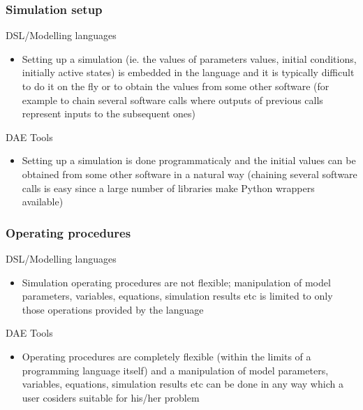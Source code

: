 \documentclass[compress,newPxFont,sthlmFooter]{beamer}
\begin{document}
\begin{frame}
\frametitle{Simulation setup}
\begin{block}{\textcolor{light_red}{DSL/Modelling languages}}
\begin{itemize}
  \item Setting up a simulation (ie. the values of parameters values, initial conditions, initially active states)
        is embedded in the language and it is typically difficult to do it on the fly or to obtain the values from some other software
        (for example to chain several software calls where outputs of previous calls represent inputs to the subsequent ones) 
\end{itemize}
\end{block}

\begin{block}{\textcolor{light_green}{DAE Tools}}
\begin{itemize}
  \item Setting up a simulation is done programmaticaly and the initial values can be obtained from some other software in a natural way
        (chaining several software calls is easy since a large number of libraries make Python wrappers available)
\end{itemize}
\end{block}
\end{frame}

\begin{frame}
\frametitle{Operating procedures}
\begin{block}{\textcolor{light_red}{DSL/Modelling languages}}
\begin{itemize}
  \item Simulation operating procedures are not flexible; manipulation of model parameters, variables, equations, simulation results
        etc is limited to only those operations provided by the language 
\end{itemize}
\end{block}

\begin{block}{\textcolor{light_green}{DAE Tools}}
\begin{itemize}
  \item Operating procedures are completely flexible (within the limits of a programming language itself)
        and a manipulation of model parameters, variables, equations, simulation results etc can be done in any way which
        a user cosiders suitable for his/her problem 
\end{itemize}
\end{block}
\end{frame}
\end{document}
